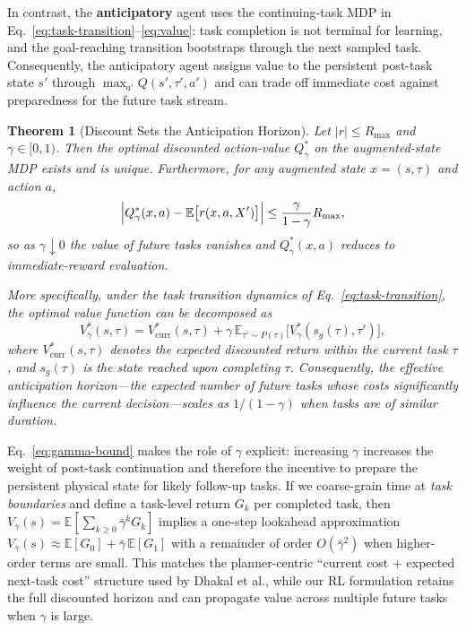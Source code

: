 \documentclass{article}
\newtheorem{theorem}{Theorem}
\begin{document}
In contrast, the \textbf{anticipatory} agent uses the continuing-task MDP in Eq.~\eqref{eq:task-transition}--\eqref{eq:value}: task completion is not terminal for learning, and the goal-reaching transition bootstraps through the next sampled task. Consequently, the anticipatory agent assigns value to the persistent post-task state $s'$ through $\max_{a'}Q(s',\tau',a')$ and can trade off immediate cost against preparedness for the future task stream.

\begin{theorem}[Discount Sets the Anticipation Horizon]
\label{thm:gamma-horizon}
Let $\lvert r \rvert \le R_{\max}$ and $\gamma \in [0,1)$. Then the optimal discounted action-value $Q^*_\gamma$ on the augmented-state MDP exists and is unique. Furthermore, for any augmented state $x=(s,\tau)$ and action $a$,
\begin{equation}
\label{eq:gamma-bound}
\Bigl\lvert Q^*_\gamma(x,a)-\mathbb{E}\bigl[r(x,a,X')\bigr]\Bigr\rvert \le \frac{\gamma}{1-\gamma}R_{\max},
\end{equation}
so as $\gamma \downarrow 0$ the value of future tasks vanishes and $Q^*_\gamma(x,a)$ reduces to immediate-reward evaluation.

More specifically, under the task transition dynamics of Eq.~\eqref{eq:task-transition}, the optimal value function can be decomposed as
\[
V^*_\gamma(s,\tau)=V^*_{\text{curr}}(s,\tau)+\gamma\,\mathbb{E}_{\tau'\sim P(\tau)}\bigl[V^*_\gamma(s_g(\tau),\tau')\bigr],
\]
where $V^*_{\text{curr}}(s,\tau)$ denotes the expected discounted return within the current task $\tau$, and $s_g(\tau)$ is the state reached upon completing $\tau$. Consequently, the effective anticipation horizon—the expected number of future tasks whose costs significantly influence the current decision—scales as $1/(1-\gamma)$ when tasks are of similar duration.
\end{theorem}

Eq.~\eqref{eq:gamma-bound} makes the role of $\gamma$ explicit: increasing $\gamma$ increases the weight of post-task continuation and therefore the incentive to prepare the persistent physical state for likely follow-up tasks. If we coarse-grain time at \emph{task boundaries} and define a task-level return $G_k$ per completed task, then $V_{\bar{\gamma}}(s)=\mathbb{E}[\sum_{k\ge 0}\bar{\gamma}^k G_k]$ implies a one-step lookahead approximation
\(
V_{\bar{\gamma}}(s)\approx \mathbb{E}[G_0]+\bar{\gamma}\,\mathbb{E}[G_1]
\)
with a remainder of order $O(\bar{\gamma}^2)$ when higher-order terms are small. This matches the planner-centric ``current cost + expected next-task cost'' structure used by Dhakal et al., while our RL formulation retains the full discounted horizon and can propagate value across multiple future tasks when $\gamma$ is large.
\end{document}
